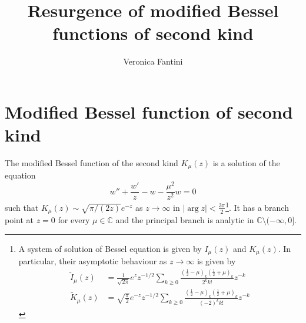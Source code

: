 \documentclass{article}
\title{Resurgence of modified Bessel functions of second kind}
\author{Veronica Fantini}
\newcommand{\C}{\mathbb{C}}
\begin{document}
\maketitle

\section{Modified Bessel function of second kind}

The modified Bessel function of the second kind $K_\mu(z)$ is a solution of the equation
\begin{equation}\label{Bessel_nu}
w''+\frac{w'}{z}-w-\frac{\mu^2}{z^2}w=0
\end{equation}
such that $K_{\mu}(z)\sim\sqrt{\pi/(2z)}e^{-z}$ as $z\to\infty$ in $|\arg z|<\frac{3\pi}{2}$\footnote{A system of solution of Bessel equation is given by $I_\mu(z)$ and $K_\mu(z)$. In particular, their asymptotic behaviour as $z\to\infty$ is given by \begin{align}
\tilde{I}_\mu(z)&=\frac{1}{\sqrt{2\pi}}e^zz^{-1/2}\sum_{k\geq 0}\frac{\left(\frac{1}{2}-\mu\right)_k\left(\frac{1}{2}+\mu\right)_k}{2^kk!}z^{-k}\\
\tilde{K}_{\mu}(z)&=\sqrt{\frac{\pi}{2}}e^{-z}z^{-1/2}\sum_{k\geq 0}\frac{\left(\frac{1}{2}-\mu\right)_k\left(\frac{1}{2}+\mu\right)_k}{(-2)^kk!}z^{-k}
\end{align}}. It has a branch point at $z=0$ for every $\mu\in\C$ and  the principal branch is analytic in $\C\setminus(-\infty,0]$. 
\end{document}
